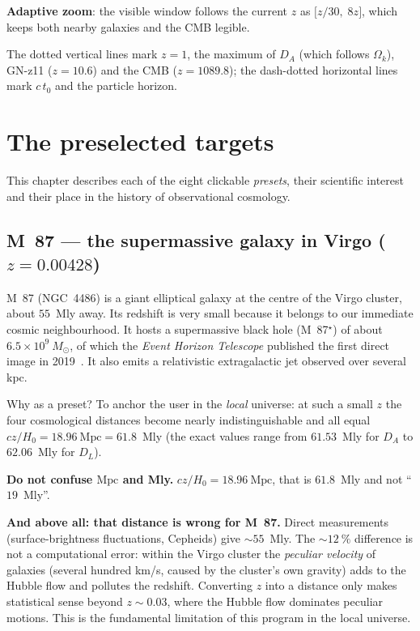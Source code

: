 \documentclass[11pt,a4paper,openany]{report}
\newcommand{\Mpc}{\text{Mpc}}
\newcommand{\Hzero}{H_{0}}
\newcommand{\Ok}{\Omega_{k}}
\begin{document}
\textbf{Adaptive zoom}: the visible window follows the current $z$ as
$\bigl[z/30,\;8z\bigr]$, which keeps both nearby galaxies and the CMB legible.

The dotted vertical lines mark $z=1$, the maximum of $D_{A}$ (which follows
$\Ok$), GN-z11 ($z = 10.6$) and the CMB ($z = 1089.8$); the dash-dotted
horizontal lines mark $c\,t_{0}$ and the particle horizon.

\chapter{The preselected targets}
\label{chap:presets}

This chapter describes each of the eight clickable \emph{presets}, their
scientific interest and their place in the history of observational cosmology.

\section{M~87 --- the supermassive galaxy in Virgo ($z = 0.00428$)}

M~87 (NGC~4486) is a giant elliptical galaxy at the centre of the Virgo
cluster, about $55$~Mly away. Its redshift is very small because it belongs to
our immediate cosmic neighbourhood. It hosts a supermassive black hole
(M~87$^{\star}$) of about $6.5\times 10^{9}~M_{\odot}$, of which the
\emph{Event Horizon Telescope} published the first direct image in
2019~\cite{EHT2019}. It also emits a relativistic extragalactic jet observed
over several kpc.

Why as a preset? To anchor the user in the \emph{local} universe: at such a
small $z$ the four cosmological distances become nearly indistinguishable and
all equal $cz/\Hzero = 18.96~\Mpc = 61.8$~Mly (the exact values range from
$61.53$~Mly for $D_{A}$ to $62.06$~Mly for $D_{L}$).

\begin{tcolorbox}[warning]
\textbf{Do not confuse $\Mpc$ and Mly.} $cz/\Hzero = 18.96~\Mpc$, that is
$61.8$~Mly and not “$19$~Mly”.

\medskip
\textbf{And above all: that distance is wrong for M~87.} Direct measurements
(surface-brightness fluctuations, Cepheids) give $\sim 55$~Mly. The $\sim 12~\%$
difference is not a computational error: within the Virgo cluster the
\emph{peculiar velocity} of galaxies (several hundred km/s, caused by the
cluster's own gravity) adds to the Hubble flow and pollutes the redshift.
Converting $z$ into a distance only makes statistical sense beyond
$z \sim 0.03$, where the Hubble flow dominates peculiar motions. This is the
fundamental limitation of this program in the local universe.
\end{tcolorbox}
\end{document}
